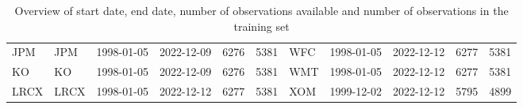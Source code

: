 \begin{table}[ht]
\begin{tabular}{llllrrlllrr}
  JPM & JPM & 1998-01-05 & 2022-12-09 & 6276 & 5381 & WFC & 1998-01-05 & 2022-12-12 & 6277 & 5381 \\ 
  KO & KO & 1998-01-05 & 2022-12-09 & 6276 & 5381 & WMT & 1998-01-05 & 2022-12-12 & 6277 & 5381 \\ 
  LRCX & LRCX & 1998-01-05 & 2022-12-12 & 6277 & 5381 & XOM & 1999-12-02 & 2022-12-12 & 5795 & 4899 \\ 
   \hline
\end{tabular}
\caption[Overview]{Overview of start date, end date, number of observations available and number of observations 
                     in the training set} 
\label{Table:Overview}
\end{table}
